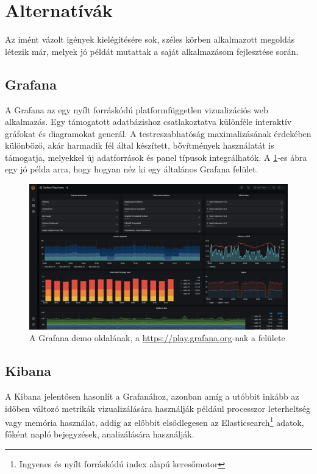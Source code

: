 \section{Alternatívák}
Az imént vázolt igények kielégítésére sok, széles körben alkalmazott megoldás létezik már, melyek jó példát mutattak a saját alkalmazásom fejlesztése során.

\subsection{Grafana}
A Grafana \cite{grafana} az egy nyílt forráskódú platformfüggetlen vizualizációs web alkalmazás.
Egy támogatott adatbázishoz csatlakoztatva különféle interaktív gráfokat és diagramokat generál.
A testreszabhatóság maximalizásának érdekében különböző, akár harmadik fél által készített, bővítmények használatát is támogatja, 
melyekkel új adatforrások és panel típusok integrálhatók. 
A \ref{fig:grafana}-es ábra egy jó példa arra, hogy hogyan néz ki egy általános Grafana felület.

\begin{figure}[!ht]
    \centering
    \includegraphics[width=150mm, keepaspectratio]{figures/grafana.png}
    \caption{A Grafana demo oldalának, a \url{https://play.grafana.org}-nak a felülete}
    \label{fig:grafana}
\end{figure}
    
\subsection{Kibana}
A Kibana \cite{kibana} jelentősen hasonlít a Grafanához, azonban amíg a utóbbit inkább az időben változó metrikák vizualizálására használják például processzor leterheltség vagy memória használat,
addig az előbbit elsődlegesen az Elasticsearch\footnote{Ingyenes és nyílt forráskódú index alapú keresőmotor} adatok, főként napló bejegyzések, analizálására használják.


